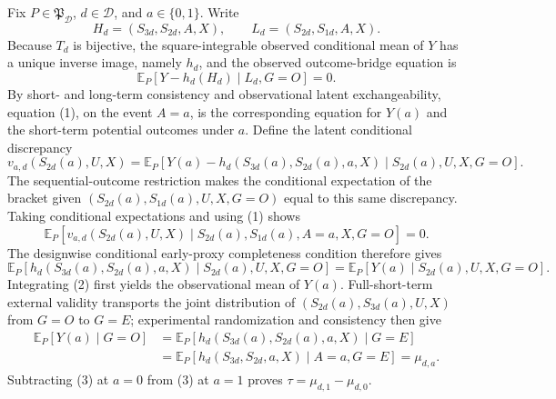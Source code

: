 Fix \(P\in\mathfrak P_{\mathcal D}\), \(d\in\mathcal D\), and \(a\in\{0,1\}\).  Write
\[
 H_d=(S_{3d},S_{2d},A,X),\qquad L_d=(S_{2d},S_{1d},A,X).
\]
Because \(T_d\) is bijective, the square-integrable observed conditional mean of \(Y\) has a unique inverse image, namely \(h_d\), and the observed outcome-bridge equation is
\[
 \mathbb E_P[Y-h_d(H_d)\mid L_d,G=O]=0. \tag{1}
\]
By short- and long-term consistency and observational latent exchangeability, equation (1), on the event \(A=a\), is the corresponding equation for \(Y(a)\) and the short-term potential outcomes under \(a\).  Define the latent conditional discrepancy
\[
 v_{a,d}(S_{2d}(a),U,X)
 =\mathbb E_P\!\left[Y(a)-h_d(S_{3d}(a),S_{2d}(a),a,X)
   \mid S_{2d}(a),U,X,G=O\right].
\]
The sequential-outcome restriction makes the conditional expectation of the bracket given \((S_{2d}(a),S_{1d}(a),U,X,G=O)\) equal to this same discrepancy.  Taking conditional expectations and using (1) shows
\[
 \mathbb E_P[v_{a,d}(S_{2d}(a),U,X)\mid
 S_{2d}(a),S_{1d}(a),A=a,X,G=O]=0.
\]
The designwise conditional early-proxy completeness condition therefore gives
\[
 \mathbb E_P[h_d(S_{3d}(a),S_{2d}(a),a,X)\mid S_{2d}(a),U,X,G=O]
 =\mathbb E_P[Y(a)\mid S_{2d}(a),U,X,G=O]. \tag{2}
\]
Integrating (2) first yields the observational mean of \(Y(a)\).  Full-short-term external validity transports the joint distribution of \((S_{2d}(a),S_{3d}(a),U,X)\) from \(G=O\) to \(G=E\); experimental randomization and consistency then give
\[
\begin{aligned}
 \mathbb E_P[Y(a)\mid G=O]
 &=\mathbb E_P[h_d(S_{3d}(a),S_{2d}(a),a,X)\mid G=E]\\
 &=\mathbb E_P[h_d(S_{3d},S_{2d},a,X)\mid A=a,G=E]
 =\mu_{d,a}. 
\end{aligned} \tag{3}
\]
Subtracting (3) at \(a=0\) from (3) at \(a=1\) proves \(\tau=\mu_{d,1}-\mu_{d,0}\).

